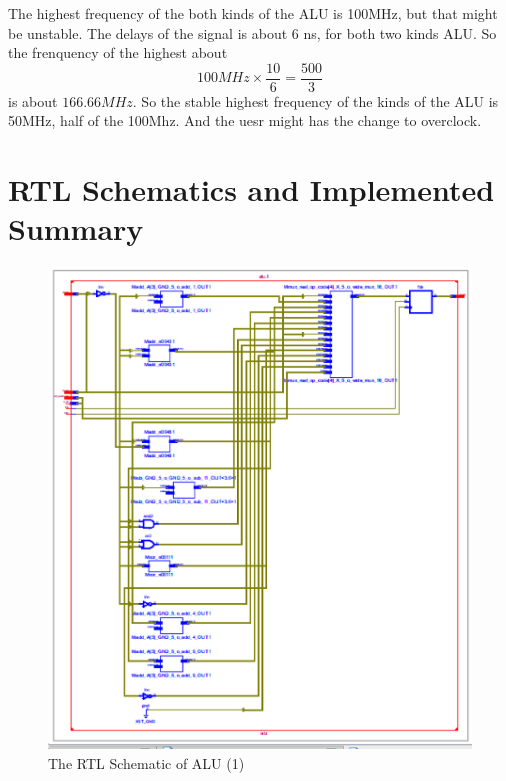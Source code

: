 \documentclass{article}
\begin{document}
      The highest frequency of the both kinds of the ALU is 100MHz, but that might be unstable.
      The delays of the signal is about 6 ns, for both two kinds ALU.
      So the frenquency of the highest about $$100MHz \times \frac{10}{6} = \frac{500}{3}$$
      is about $166.66MHz$.    
      So the stable highest frequency of the kinds of the ALU is 50MHz, half of the 100Mhz.
      And the uesr might has the change to overclock.

      \section{RTL Schematics and Implemented Summary}
      \label{sec:rsnis}

\begin{figure}
\centering
\includegraphics[width=1\linewidth]{homework6-8}
\caption{The RTL Schematic of ALU (1)}
\label{fig:homework6-8}
\end{figure}
\end{document}
